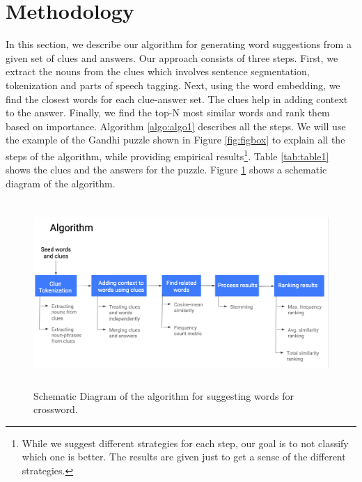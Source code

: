 \documentclass[twoside]{article}
\begin{document}
\section{Methodology}
\label{sec:sec3}
In this section, we describe our algorithm for generating word suggestions from a given set of clues and answers. Our approach consists of three steps. First, we extract the nouns from the clues which involves sentence segmentation, tokenization and parts of speech tagging. Next, using the word embedding, we find the closest words for each clue-answer set. The clues help in adding context to the answer. Finally, we find the top-N most similar words and rank them based on importance. Algorithm \ref{algo:algo1} describes all the steps. We will use the example of the Gandhi puzzle shown in Figure \ref{fig:figbox} to explain all the steps of the algorithm, while providing empirical results\footnote{While we suggest different strategies for each step, our goal is to not classify which one is better. The results are given just to get a sense of the different strategies.}. Table \ref{tab:table1} shows the clues and the answers for the puzzle. Figure \ref{fig:algo_schematic} shows a schematic diagram of the algorithm. 

\begin{figure}
  \centering
  \includegraphics[height=200pt]{images/algo_schematic.png}
  \caption{Schematic Diagram of the algorithm for suggesting words for crossword.}
  \label{fig:algo_schematic}
\end{figure}
\end{document}

